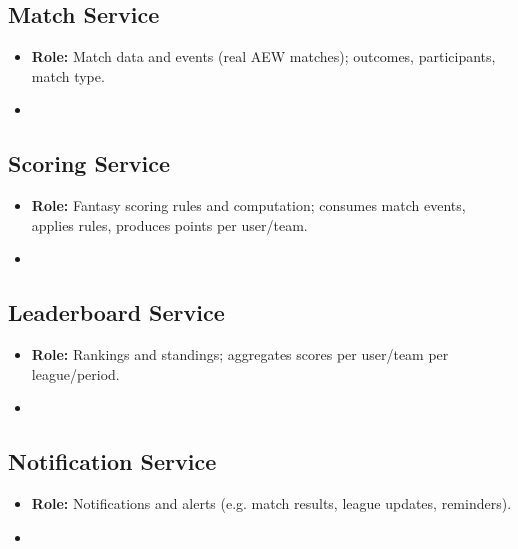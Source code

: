 \documentclass[11pt,a4paper]{article}
\begin{document}
\subsection{Match Service}
\begin{itemize}
\item \textbf{Role:} Match data and events (real AEW matches); outcomes, participants, match type.
\item %
\end{itemize}

\subsection{Scoring Service}
\begin{itemize}
\item \textbf{Role:} Fantasy scoring rules and computation; consumes match events, applies rules, produces points per user/team.
\item %
\end{itemize}

\subsection{Leaderboard Service}
\begin{itemize}
\item \textbf{Role:} Rankings and standings; aggregates scores per user/team per league/period.
\item %
\end{itemize}

\subsection{Notification Service}
\begin{itemize}
\item \textbf{Role:} Notifications and alerts (e.g. match results, league updates, reminders).
\item %
\end{itemize}
\end{document}
